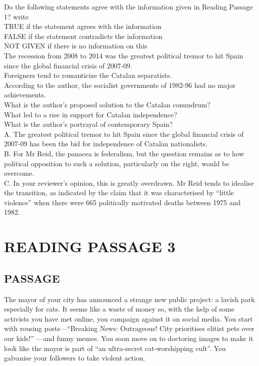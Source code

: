 \documentclass[10pt, a4paper, oneside]{article}
\begin{document}
\begin{spacing}{2.0}
Do the following statements agree with the information given in Reading Passage 1?
write\\
TRUE if the statement agrees with the information\\
FALSE if the statement contradicts the information\\
NOT GIVEN if there is no information on this\\

The recession from 2008 to 2014 was the greatest political tremor to hit Spain since the global financial crisis of 2007-09.\\
Foreigners tend to romanticize the Catalan separatists.\\
According to the author, the socialist governments of 1982-96 had no major achievements.\\

What is the author's proposed solution to the Catalan conundrum?\\
What led to a rise in support for Catalan independence?\\
What is the author's portrayal of contemporary Spain?\\
A. The greatest political tremor to hit Spain since the global financial crisis of 2007-09 has been the bid for independence of Catalan nationalists.\\
B. For Mr Reid, the panacea is federalism, but the question remains as to how political opposition to such a solution, particularly on the right, would be overcome.\\
C. In your reviewer's opinion, this is greatly overdrawn. Mr Reid tends to idealise the transition, 
as indicated by the claim that it was characterised by “little violence” when there were 665 politically 
motivated deaths between 1975 and 1982.\\

\section{READING PASSAGE 3}
\subsection{PASSAGE}
The mayor of your city has announced a strange new public project: a lavish park especially for cats. It
seems like a waste of money so, with the help of some activists you have met online, you campaign
against it on social media. You start with rousing posts—“Breaking News: Outrageous! City prioritises elitist pets over our kids!”
—and funny memes. You soon move on to doctoring images to make it look like the mayor is part of “an ultra-secret cat-worshipping cult”. 
You galvanise your followers to take violent action.


\end{spacing}
\end{document}
